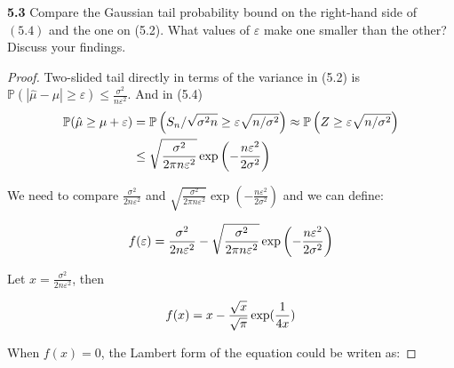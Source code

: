 






\noindent\textbf{5.3} Compare the Gaussian tail probability bound on the right-hand side of $(5.4)$ and the one on (5.2). What values of $\varepsilon$ make one smaller than the other? Discuss your findings.

\begin{proof}
	Two-slided tail directly in terms of the variance in (5.2) is $\mathbb{P}(|\hat{\mu}-\mu| \geq \varepsilon) \leq \frac{\sigma^{2}}{n \varepsilon^{2}}$. And in (5.4) 
	\begin{equation}
	\begin{aligned}
 	\notag
	\mathbb{P}(\hat{\mu} \geq \mu+\varepsilon) &=\mathbb{P}\left(S_{n} / \sqrt{\sigma^{2} n} \geq \varepsilon \sqrt{n / \sigma^{2}}\right) \approx \mathbb{P}\left(Z \geq \varepsilon \sqrt{n / \sigma^{2}}\right) \\
	& \leq \sqrt{\frac{\sigma^{2}}{2 \pi n \varepsilon^{2}}} \exp \left(-\frac{n \varepsilon^{2}}{2 \sigma^{2}}\right)
	\end{aligned}
	\end{equation}

	We need to compare $\frac {\sigma^2} {2 n \varepsilon^2}$ and $ \sqrt{\frac{\sigma^{2}}{2 \pi n \varepsilon^{2}}} \exp \left(-\frac{n \varepsilon^{2}}{2 \sigma^{2}}\right)$ and we can define:

	\begin{equation}
	\begin{aligned}
		 \notag
		f(\varepsilon) = \frac {\sigma^2} {2 n \varepsilon^2}- \sqrt{\frac{\sigma^{2}}{2 \pi n \varepsilon^{2}}} \exp \left(-\frac{n \varepsilon^{2}}{2 \sigma^{2}}\right)
	\end{aligned}	
	\end{equation}


	Let $x = \frac {\sigma ^2} {2 n \varepsilon^2}$, then 

	\begin{equation}
	\begin{aligned}
		 \notag
		f(x) = x - \frac {\sqrt {x}} {\sqrt{\pi}} \exp(\frac 1 {4 x})
	\end{aligned}
	\end{equation}


	When $f(x) = 0$, the Lambert form of the equation could be writen as:


\end{proof}
